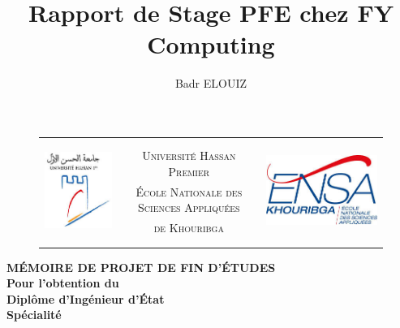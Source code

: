 \documentclass[a4paper,11pt,oneside]{report}
\author{Badr ELOUIZ}
\title{Rapport de Stage PFE chez FY Computing}
\begin{document}
\sloppy

\makeatletter
  \begin{titlepage}
  \centering
  
    \begin{figure}[t]
        \begin{tabular}{c c c}
            \multirow{7}{*}{\includegraphics[scale=0.45]{HASS.png}} & &             \multirow{7}{*}{\includegraphics[scale=0.35]{logens.png}}\\
             & & \\
             & \textsc{Université Hassan Premier} & \\
             & \textsc{\'Ecole Nationale des Sciences Appliqu\'ees} & \\
             & \textsc{de Khouribga} & \\
             & & \\
             & & \\
        \end{tabular}
    \end{figure}
        \vfill
    {\LARGE \textbf{M\'EMOIRE DE PROJET DE FIN D'\'ETUDES}}\\
        \vspace{0.5em}
    {\large \textbf{Pour l'obtention du}}\\
        \vspace{0.5em}
    {\LARGE \textbf{Diplôme d'Ingénieur d'\'Etat}}\\
        \vspace{0.5em}
    {\large \textbf{Spécialité}}\\

\end{titlepage}
\end{document}
